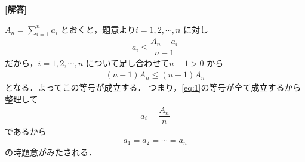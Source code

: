 \documentclass[../../main.tex]{subfiles}
\begin{document}
\begin{oframed}
  
\end{oframed}

{\bf [解答]}

$A_n = \sum_{i=1}^n a_i$ とおくと，題意より$i=1,2,\cdots,n$ に対し
\begin{align}
  a_i \le \dfrac{A_n - a_i}{n-1} \label{eq:1}
\end{align}
だから，$i=1,2,\cdots, n$ について足し合わせて$n-1 > 0$ から
\begin{align}
  (n-1)A_n \le (n-1)A_n
\end{align}
となる．よってこの等号が成立する．
つまり，\cref{eq:1}の等号が全て成立するから整理して
\begin{align}
  a_i = \dfrac{A_n}{n}
\end{align}
であるから
\begin{align}
  a_1 = a_2 = \cdots = a_n
\end{align}
の時題意がみたされる．
\end{document}
